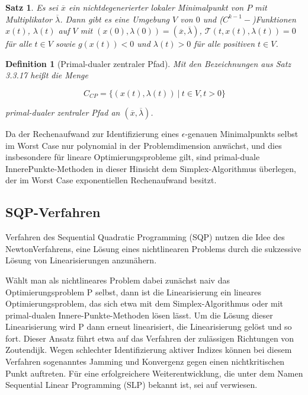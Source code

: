 \documentclass[11pt]{scrreprt}
\newcounter{thm}
\theoremstyle{thmstyle}
\numberwithin{thm}{section}
\newtheorem{definition}[thm]{Definition}
\newtheorem{satz}[thm]{Satz}
\begin{document}
\begin{satz}
	Es sei $\overline{x}$ ein nichtdegenerierter lokaler Minimalpunkt von $P$ mit Multiplikator $\overline{\lambda}$. Dann gibt es eine Umgebung $V$ von $0$ und ($C^{k-1}-$)Funktionen $x(t)$, $\lambda(t)$ auf $V$ mit $(x(0), \lambda(0)) = (\overline{x}, \overline{\lambda})$, $\mathcal{T}(t, x(t), \lambda(t)) = 0$ für alle $t \in V$ sowie $g(x(t)) < 0$ und $\lambda(t) > 0$ für alle positiven $t \in V$.
\end{satz}	

\begin{definition}[Primal-dualer zentraler Pfad]
	Mit den Bezeichnungen aus Satz 3.3.17 heißt die Menge

		$$ C_{CP} = \big\{ (x(t), \lambda(t)) ~|~ t \in V, t> 0 \big\} $$
		
	primal-dualer zentraler Pfad an $(\overline{x}, \overline{\lambda})$.
\end{definition}

Da der Rechenaufwand zur Identifizierung eines $\epsilon$-genauen Minimalpunkts selbst im Worst Case nur polynomial in der Problemdimension anwächst, und dies insbesondere für lineare Optimierungsprobleme gilt, sind primal-duale InnerePunkte-Methoden in dieser Hinsicht dem Simplex-Algorithmus überlegen, der im Worst Case exponentiellen Rechenaufwand besitzt.

\subsection*{SQP-Verfahren}

Verfahren des Sequential Quadratic Programming (SQP) nutzen die Idee des NewtonVerfahrens, eine Lösung eines nichtlinearen Problems durch die sukzessive Lösung von Linearisierungen anzunähern.~\bigskip

Wählt man als nichtlineares Problem dabei zunächst naiv das Optimierungsproblem P selbst, dann ist die Linearisierung ein lineares Optimierungsproblem, das sich etwa mit dem Simplex-Algorithmus oder mit primal-dualen Innere-Punkte-Methoden lösen lässt. Um die Lösung dieser Linearisierung wird P dann erneut linearisiert, die Linearisierung gelöst und so fort. Dieser Ansatz führt etwa auf das Verfahren der zulässigen Richtungen von Zoutendijk. Wegen schlechter Identifizierung aktiver Indizes können bei diesem Verfahren sogenanntes Jamming und Konvergenz gegen einen nichtkritischen Punkt auftreten. Für eine erfolgreichere Weiterentwicklung, die unter dem Namen Sequential Linear Programming (SLP) bekannt ist, sei auf verwiesen. ~\bigskip
\end{document}
